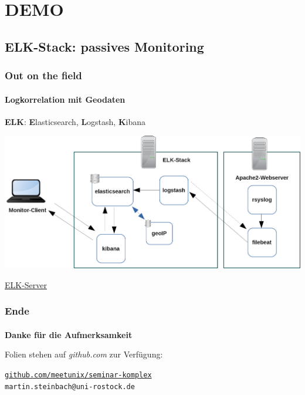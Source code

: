 \documentclass[10pt]{beamer} %
\begin{document}
\section{DEMO}
\frame{\tableofcontents[currentsection]}

\subsection{ELK-Stack: passives Monitoring}
\begin{frame}
\frametitle{Out on the field}
\framesubtitle{Logkorrelation mit Geodaten}

\hspace{1.5cm}\textbf{ELK}:\hspace{1.5cm} \textbf{E}lasticsearch, \textbf{L}ogstash, 
\textbf{K}ibana

\vspace{0.6cm}

\begin{center}
    \includegraphics[scale=0.25]{img/demo-elk.png}
\end{center}


\tiny{
  \href{https://seminar-server.dyndns.dk/app/kibana}{ELK-Server}}

\end{frame}

\begin{frame}
\frametitle{Ende}
\framesubtitle{}



\begin{center}
    \textbf{Danke für die Aufmerksamkeit}
     \vspace{0.5cm}
     


    \vspace{1.0cm}
    \footnotesize{
        Folien stehen auf \textit{github.com} zur Verfügung:\\
        \vspace{0.5cm}

       \texttt{ 
       {\color{blue}\href{https://github.com/meetunix/seminar-komplex/blob/master/folien/seminar-komplex.pdf}
        {github.com/meetunix/seminar-komplex}}}\\
        \vspace{0.7cm}
        \texttt{martin.steinbach@uni-rostock.de}
    }
\end{center}
\end{frame}
\end{document}

